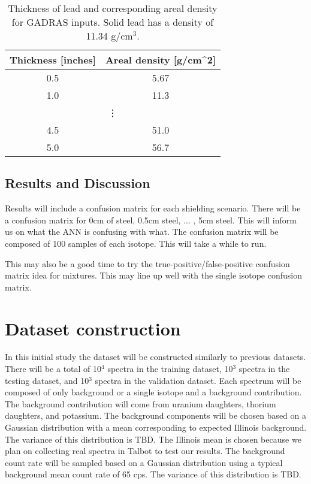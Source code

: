\documentclass[thesis,tocnosub,noragright,centerchapter,12pt,fullpage]{uiucecethesis09}
\begin{document}
\begin{table}[]
\centering
\caption{Thickness of lead and corresponding areal density for GADRAS inputs. Solid lead has a density of 11.34 g/cm$^{3}$.}
\label{my-label}
\begin{tabular}{|c|c|}
\hline
Thickness {[}inches{]} & Areal density {[}g/cm\textasciicircum 2{]} \\ \hline
0.5 & 5.67 \\ \hline
1.0 & 11.3 \\ \hline
\multicolumn{2}{c}{\vdots} \\ \hline
4.5 & 51.0 \\ \hline
5.0 & 56.7 \\ \hline
\end{tabular}
\end{table}

\subsection{Results and Discussion}

Results will include a confusion matrix for each shielding scenario. There will be a confusion matrix for 0cm of steel, 0.5cm steel, ... , 5cm steel. This will inform us on what the ANN is confusing with what. The confusion matrix will be composed of 100 samples of each isotope. This will take a while to run.

This may also be a good time to try the true-positive/false-positive confusion matrix idea for mixtures. This may line up well with the single isotope confusion matrix.












\section{Dataset construction}

In this initial study the dataset will be constructed similarly to previous datasets. There will be a total of 10$^{4}$ spectra in the training dataset, 10$^{3}$ spectra in the testing dataset, and 10$^{3}$ spectra in the validation dataset. Each spectrum will be composed of only background or  a single isotope and a background contribution. The background contribution will come from uranium daughters, thorium daughters, and potassium. The background components will be chosen based on a Gaussian distribution with a mean corresponding to expected Illinois background. The variance of this distribution is TBD. The Illinois mean is chosen because we plan on collecting real spectra in Talbot to test our results. The background count rate will be sampled based on a Gaussian distribution using a typical background mean count rate of 65 cps. The variance of this distribution is TBD. 
\end{document}
